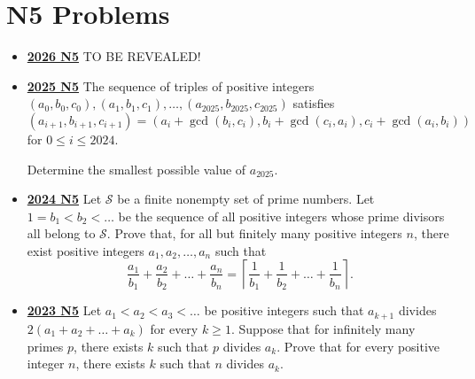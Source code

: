 \documentclass[11pt]{scrartcl}
\begin{document}
\section*{N5 Problems}\label{N5}
\begin{itemize}[leftmargin=*]

\item \href{https://www.imo-official.org/assets/documents/problems/2026/IMO2026SL.pdf}{\textbf{2026 N5}} TO BE REVEALED!


\item \href{https://artofproblemsolving.com/community/c6h3866855p38676941}{\textbf{2025 N5}} The sequence of triples of positive integers $(a_0, b_0, c_0) , (a_1, b_1, c_1), \dots, (a_{2025}, b_{2025}, c_{2025})$ satisfies
    \[ (a_{i+1},b_{i+1},c_{i+1}) = (a_i+\gcd(b_i,c_i),b_i+\gcd(c_i,a_i) ,c_i+\gcd(a_i,b_i)  )    \]
    for $0\leqslant i \leqslant 2024$.

    Determine the smallest possible value of $a_{2025}$. 

\item \href{https://artofproblemsolving.com/community/c6h3610445p35340917}{\textbf{2024 N5}} Let $\mathcal{S}$ be a finite nonempty set of prime numbers. Let $1 = b_1 < b_2 < \dots$ be the sequence of all positive integers whose prime divisors all belong to $\mathcal{S}$. Prove that, for all but finitely many positive integers $n$, there exist positive integers $a_1, a_2, \dots, a_n$ such that
\[
    \frac{a_1}{b_1} + \frac{a_2}{b_2} + \dots + \frac{a_n}{b_n} = \left\lceil \frac{1}{b_1} + \frac{1}{b_2} + \dots + \frac{1}{b_n} \right\rceil.
\]	

\item \href{https://artofproblemsolving.com/community/c6h3359746p31218469}{\textbf{2023 N5}} Let $a_1<a_2<a_3<\dots$ be positive integers such that $a_{k+1}$ divides $2(a_1+a_2+\dots+a_k)$ for every $k\geqslant  1$. Suppose that for infinitely many primes $p$, there exists $k$ such that $p$ divides $a_k$. Prove that for every positive integer $n$, there exists $k$ such that $n$ divides $a_k$.	


\end{itemize}
\end{document}
